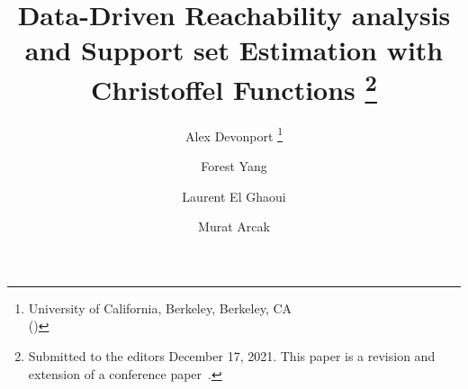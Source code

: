%
\newcommand{\cclass}{\mathcal{C}}
\newcommand{\risk}[1][c]{\ensuremath{r(#1)}}
\newcommand{\erisk}[1][c]{\ensuremath{\hat{r}(#1)}}
\newcommand{\srisk}[1][Q]{\ensuremath{r_{#1}}}
\newcommand{\esrisk}[1][Q]{\ensuremath{\hat{r}_{#1}}}


%
\usepackage{mathtools}
\DeclarePairedDelimiter{\ceil}{\lceil}{\rceil}

\newtheorem{problem}{Problem}

%
\newcommand{\creflastconjunction}{, and~}

%

%

%
%
\title{Data-Driven Reachability analysis and Support set Estimation with Christoffel Functions%
    \thanks{Submitted to the editors December 17, 2021. This paper is a revision and extension of a conference paper~\cite{devonport2021datadriven}.
}}

%
\author{Alex Devonport 
    \thanks{University of California, Berkeley,
    Berkeley, CA\\ ()}
    \and Forest Yang\footnotemark[2]
    \and Laurent El Ghaoui\footnotemark[2] 
    \and Murat Arcak\footnotemark[2]
}

\usepackage{amsopn}
\DeclareMathOperator{\diag}{diag}


%
\makeatletter
\newcommand*{\addFileDependency}[1]{%
  \typeout{(#1)}%
  \@addtofilelist{#1}%
  \IfFileExists{#1}{}{\typeout{No file #1.}}%
}
\makeatother

\newcommand*{\myexternaldocument}[1]{%
    \addFileDependency{#1.tex}%
    \addFileDependency{#1.aux}%
}
%
%
%
%
%
